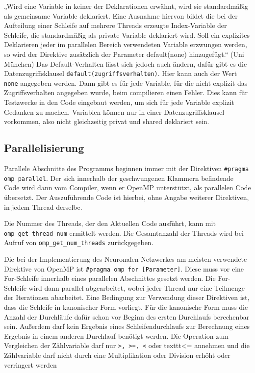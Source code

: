 \documentclass[../main.tex]{subfiles}
\begin{document}
„Wird eine Variable in keiner der Deklarationen erwähnt, wird sie standardmäßig als gemeinsame Variable deklariert. Eine Ausnahme hiervon bildet die bei der Aufteilung einer Schleife auf mehrere Threads erzeugte Index-Variable der Schleife, die standardmäßig als private Variable deklariert wird. Soll ein explizites Deklarieren jeder im parallelen Bereich verwendeten Variable erzwungen werden, so wird der Direktive zusätzlich der Parameter default(none) hinzugefügt.“ (Uni München)
Das Default-Verhalten lässt sich jedoch auch ändern, dafür gibt es die Datenzugriffsklausel \texttt{default(zugriffsverhalten)}. Hier kann auch der Wert \texttt{none} angegeben werden. Dann gibt es für jede Variable, für die nicht explizit das Zugriffsverhalten angegeben wurde, beim compilieren einen Fehler. Dies kann für Testzwecke in den Code eingebaut werden, um sich für jede Variable explizit Gedanken zu machen.
Variablen können nur in einer Datenzugriffsklausel vorkommen, also nicht gleichzeitig privat und shared deklariert sein.

\subsection{Parallelisierung}

Parallele Abschnitte des Programms beginnen immer mit der Direktiven \texttt{\#pragma omp parallel}. Der sich innerhalb der geschwungenen Klammern befindende Code wird dann vom Compiler, wenn er OpenMP unterstützt, als parallelen Code übersetzt. Der Auszuführende Code ist hierbei, ohne Angabe weiterer Direktiven, in jedem Thread derselbe. 

Die Nummer des Threads, der den Aktuellen Code ausführt, kann mit \linebreak \texttt{omp\_get\_thread\_num} ermittelt werden. Die Gesamtanzahl der Threads wird bei Aufruf von \texttt{omp\_get\_num\_threads} zurückgegeben.

Die bei der Implementierung des Neuronalen Netzwerkes am meisten verwendete Direktive von OpenMP ist \texttt{\#pragma omp for [Parameter]}. Diese muss vor eine For-Schleife innerhalb eines parallelen Abschnittes gesetzt werden. Die For-Schleife wird dann parallel abgearbeitet, wobei jeder Thread nur eine Teilmenge der Iterationen abarbeitet. Eine Bedingung zur Verwendung dieser Direktiven ist, dass die Schleife in kanonischer Form vorliegt. Für die kanonische Form muss die Anzahl der Durchläufe dafür schon vor Beginn des ersten Durchlaufs berechenbar sein. Außerdem darf kein Ergebnis eines Schleifendurchlaufs zur Berechnung eines Ergebnis in einem anderen Durchlauf benötigt werden. Die Operation zum Vergleichen der Zählvariable darf nur \texttt{>, >=, <} oder texttt{<=} annehmen und die Zählvariable darf nicht durch eine Multiplikation oder Division erhöht oder verringert werden
\end{document}
